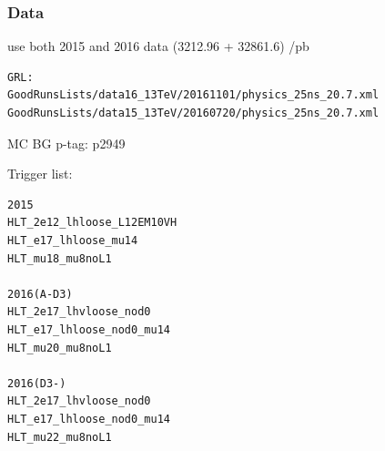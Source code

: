 \documentclass[mathserif,serif]{beamer}
\begin{document}
\begin{frame}[fragile]
\frametitle{Data}
\small
use both 2015 and 2016 data (3212.96 + 32861.6) /pb
\tiny
\begin{verbatim}
GRL:
GoodRunsLists/data16_13TeV/20161101/physics_25ns_20.7.xml
GoodRunsLists/data15_13TeV/20160720/physics_25ns_20.7.xml
\end{verbatim}
\end{frame}

\begin{frame}{MC BG}
p-tag: p2949
\end{frame}

\begin{frame}[fragile]
\small
Trigger list:\\
\scriptsize
\begin{verbatim}
2015
HLT_2e12_lhloose_L12EM10VH
HLT_e17_lhloose_mu14
HLT_mu18_mu8noL1

2016(A-D3)
HLT_2e17_lhvloose_nod0
HLT_e17_lhloose_nod0_mu14
HLT_mu20_mu8noL1

2016(D3-)
HLT_2e17_lhvloose_nod0
HLT_e17_lhloose_nod0_mu14
HLT_mu22_mu8noL1
\end{verbatim}
\end{frame}
\end{document}
